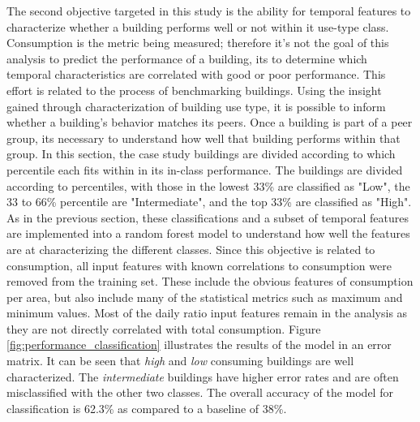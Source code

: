 The second objective targeted in this study is the ability for temporal features to characterize whether a building performs well or not within it use-type class. Consumption is the metric being measured; therefore it's not the goal of this analysis to predict the performance of a building, its to determine which temporal characteristics are correlated with good or poor performance. This effort is related to the process of benchmarking buildings. Using the insight gained through characterization of building use type, it is possible to inform whether a building's behavior matches its peers. Once a building is part of a peer group, its necessary to understand how well that building performs within that group. In this section, the case study buildings are divided according to which percentile each fits within in its in-class performance. The buildings are divided according to percentiles, with those in the lowest 33\% are classified as "Low", the 33 to 66\% percentile are "Intermediate", and the top 33\% are classified as "High". As in the previous section, these classifications and a subset of temporal features are implemented into a random forest model to understand how well the features are at characterizing the different classes. Since this objective is related to consumption, all input features with known correlations to consumption were removed from the training set. These include the obvious features of consumption per area, but also include many of the statistical metrics such as maximum and minimum values. Most of the daily ratio input features remain in the analysis as they are not directly correlated with total consumption. Figure \ref{fig:performance_classification} illustrates the results of the model in an error matrix. It can be seen that \emph{high} and \emph{low} consuming buildings are well characterized. The \emph{intermediate} buildings have higher error rates and are often misclassified with the other two classes. The overall accuracy of the model for classification is 62.3\% as compared to a baseline of 38\%.


